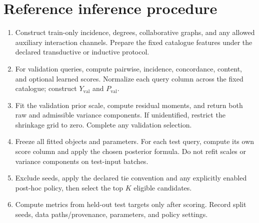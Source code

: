 \documentclass[11pt,a4paper]{article}
\theoremstyle{remark}
\begin{document}
\section{Reference inference procedure}
\begin{enumerate}
 \item Construct train-only incidence, degrees, collaborative graphs,
 and any allowed auxiliary interaction channels. Prepare the fixed
 catalogue features under the declared transductive or inductive protocol.
 \item For validation queries, compute pairwise, incidence, concordance,
 content, and optional learned scores. Normalize each query column across
 the fixed catalogue; construct $Y_{\mathrm{val}}$ and $P_{\mathrm{val}}$.
 \item Fit the validation prior scale, compute residual moments, and
 return both raw and admissible variance components. If unidentified,
 restrict the shrinkage grid to zero. Complete any validation selection.
 \item Freeze all fitted objects and parameters. For each test query,
 compute its own score column and apply the chosen posterior formula.
 Do not refit scales or variance components on test-input batches.
 \item Exclude seeds, apply the declared tie convention and any explicitly
 enabled post-hoc policy, then select the top $K$ eligible candidates.
 \item Compute metrics from held-out test targets only after scoring.
 Record split seeds, data paths/provenance, parameters, and policy settings.
\end{enumerate}
\end{document}
